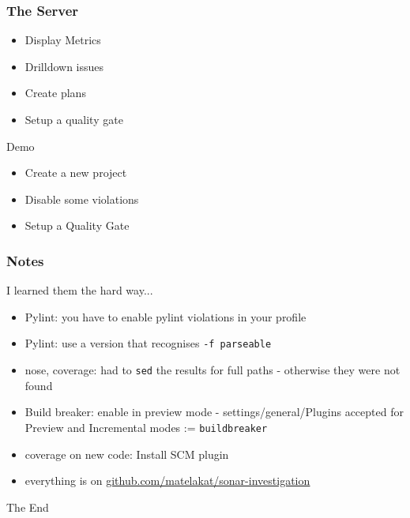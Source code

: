 \documentclass{beamer}
\newcommand{\myhref}[2]{\href{#1}{{\uline{#2}}}}
\begin{document}
\begin{frame}
    \frametitle{The Server}
    \begin{itemize}
        \item Display Metrics
        \pause
        \item Drilldown issues
        \pause
        \item Create plans
        \pause
        \item Setup a quality gate
    \end{itemize}
\end{frame}

\begin{frame}
    \begin{center}
        \Large{Demo}
    \end{center}
    \begin{block}{}
    \begin{itemize}
    \pause
    \item Create a new project
    \pause
    \item Disable some violations
    \pause
    \item Setup a Quality Gate
    \end{itemize}
    \end{block}
\end{frame}

\begin{frame}
\frametitle{Notes}
\begin{block}{I learned them the hard way...}
\begin{itemize}
    \item Pylint: you have to enable pylint violations in your profile
    \item Pylint: use a version that recognises \texttt{-f parseable}
    \item nose, coverage: had to \texttt{sed} the results for full paths -
    otherwise they were not found
    \item Build breaker: enable in preview mode - settings/general/Plugins
    accepted for Preview and Incremental modes := \texttt{buildbreaker}
    \item coverage on new code: Install SCM plugin
    \item everything is on \myhref{https://github.com/matelakat/sonar-investigation}{github.com/matelakat/sonar-investigation}
\end{itemize}
\end{block}
\end{frame}


\begin{frame}
    \begin{center}
        \Large{The End}
    \end{center}
\end{frame}
\end{document}
